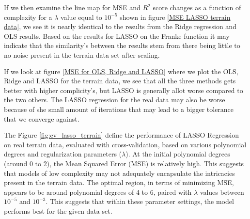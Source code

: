 \noindent If we then examine the line map for MSE and $R^2$ score changes as a function of complexity for a $\lambda$ value equal to $10^{-5}$ shown in figure \eqref{MSE LASSO terrain data}, we see it is nearly identical to the results from the Ridge regression and OLS results. Based on the results for LASSO on the Franke function it may indicate that the similarity's between the results stem from there being little to no noise present in the terrain data set after scaling. 

\noindent If we look at figure \eqref{MSE for OLS, Ridge and LASSO} where we plot the OLS, Ridge and LASSO for the terrain data, we see that all the three methods gets better with higher complicity's, but LASSO is generally allot worse compared to the two others. The LASSO regression for the real data may also be worse because of she small amount of iterations that may lead to a bigger tolerance that we converge against.

\noindent The Figure \eqref{fig:cv_lasso_terrain} define the performance of LASSO Regression on real terrain data, evaluated with cross-validation, based on various polynomial degrees and regularization parameters ($\lambda$). At the initial polynomial degrees (around 0 to 2), the Mean Squared Error (MSE) is relatively high. This suggests that models of low complexity may not adequately encapsulate the intricacies present in the terrain data. The optimal region, in terms of minimizing MSE, appears to be around polynomial degrees of 4 to 6, paired with $\lambda$ values between $10^{-5}$ and $10^{-3}$. This suggests that within these parameter settings, the model performs best for the given data set.
